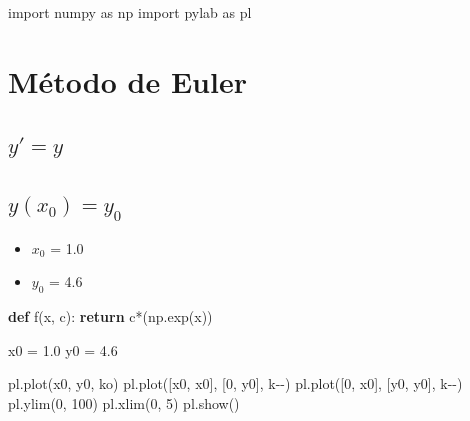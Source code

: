 \documentclass[
  letterpaper,
  DIV=11,
  numbers=noendperiod]{scrreprt}
\newenvironment{Shaded}{\begin{snugshade}}{\end{snugshade}}
\newcommand{\ControlFlowTok}[1]{\textcolor[rgb]{0.00,0.23,0.31}{\textbf{#1}}}
\newcommand{\DecValTok}[1]{\textcolor[rgb]{0.68,0.00,0.00}{#1}}
\newcommand{\FloatTok}[1]{\textcolor[rgb]{0.68,0.00,0.00}{#1}}
\newcommand{\ImportTok}[1]{\textcolor[rgb]{0.00,0.46,0.62}{#1}}
\newcommand{\KeywordTok}[1]{\textcolor[rgb]{0.00,0.23,0.31}{\textbf{#1}}}
\newcommand{\NormalTok}[1]{\textcolor[rgb]{0.00,0.23,0.31}{#1}}
\newcommand{\OperatorTok}[1]{\textcolor[rgb]{0.37,0.37,0.37}{#1}}
\newcommand{\StringTok}[1]{\textcolor[rgb]{0.13,0.47,0.30}{#1}}
\providecommand{\tightlist}{%
  \setlength{\itemsep}{0pt}\setlength{\parskip}{0pt}}
\begin{document}
\begin{Shaded}
\begin{Highlighting}[]
\ImportTok{import}\NormalTok{ numpy }\ImportTok{as}\NormalTok{ np}
\ImportTok{import}\NormalTok{ pylab }\ImportTok{as}\NormalTok{ pl}
\end{Highlighting}
\end{Shaded}

\chapter{Método de Euler}\label{muxe9todo-de-euler}

\section{\texorpdfstring{\(y' = y\)}{y\textquotesingle{} = y}}\label{y-y}

\section{\texorpdfstring{\(y(x_0) = y_0\)}{y(x\_0) = y\_0}}\label{yx_0-y_0}

\begin{itemize}
\tightlist
\item
  \(x_0\) = 1.0
\item
  \(y_0\) = 4.6
\end{itemize}

\begin{Shaded}
\begin{Highlighting}[]
\KeywordTok{def}\NormalTok{ f(x, c):}
    \ControlFlowTok{return}\NormalTok{ c}\OperatorTok{*}\NormalTok{(np.exp(x))}
\end{Highlighting}
\end{Shaded}

\begin{Shaded}
\begin{Highlighting}[]
\NormalTok{x0 }\OperatorTok{=} \FloatTok{1.0}
\NormalTok{y0 }\OperatorTok{=} \FloatTok{4.6}
\end{Highlighting}
\end{Shaded}

\begin{Shaded}
\begin{Highlighting}[]
\NormalTok{pl.plot(x0, y0, }\StringTok{\textquotesingle{}ko\textquotesingle{}}\NormalTok{)}
\NormalTok{pl.plot([x0, x0], [}\DecValTok{0}\NormalTok{, y0], }\StringTok{\textquotesingle{}k{-}{-}\textquotesingle{}}\NormalTok{)}
\NormalTok{pl.plot([}\DecValTok{0}\NormalTok{, x0], [y0, y0], }\StringTok{\textquotesingle{}k{-}{-}\textquotesingle{}}\NormalTok{)}
\NormalTok{pl.ylim(}\DecValTok{0}\NormalTok{, }\DecValTok{100}\NormalTok{)}
\NormalTok{pl.xlim(}\DecValTok{0}\NormalTok{, }\DecValTok{5}\NormalTok{)}
\NormalTok{pl.show()}
\end{Highlighting}
\end{Shaded}
\end{document}
